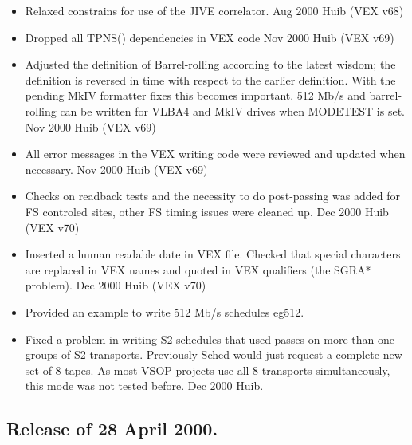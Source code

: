 \documentclass{report}
\begin{document}
\begin{itemize}
\item Relaxed constrains for use of the JIVE correlator. Aug 2000 Huib
  (VEX v68)

\item Dropped all TPNS() dependencies in VEX code Nov 2000 Huib (VEX
  v69)

\item Adjusted the definition of Barrel-rolling according to the latest
  wisdom; the definition is reversed in time with respect to the
  earlier definition. With the pending MkIV formatter fixes this
  becomes important. 512 Mb/s and barrel-rolling can be written for
  VLBA4 and MkIV drives when MODETEST is set. Nov 2000 Huib (VEX v69)

\item All error messages in the VEX writing code were reviewed and
  updated when necessary. Nov 2000 Huib (VEX v69)

\item Checks on readback tests and the necessity to do post-passing was
  added for FS controled sites, other FS timing issues were cleaned
  up. Dec 2000 Huib (VEX v70)

\item Inserted a human readable date in VEX file. Checked that special
  characters are replaced in VEX names and quoted in VEX qualifiers
  (the SGRA* problem). Dec 2000 Huib (VEX v70)

\item Provided an example to write 512 Mb/s schedules eg512.

\item Fixed a problem in writing S2 schedules that used passes on more
  than one groups of S2 transports. Previously Sched would just request
  a complete new set of 8 tapes. As most VSOP projects use all 8
  transports simultaneously, this mode was not tested before. Dec 2000
  Huib.

\end{itemize}

\subsection{\label{SSSEC:20APR2000}Release of 28 April 2000.}
\end{document}
